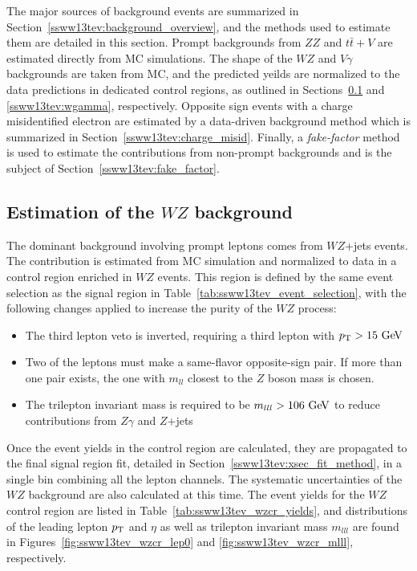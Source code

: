 The major sources of background events are summarized in Section~\ref{ssww13tev:background_overview}, and the methods used to estimate them are detailed in this section.  
Prompt backgrounds from $ZZ$ and $t\bar{t}+V$ are estimated directly from MC simulations.
The shape of the $WZ$ and $V\gamma$ backgrounds are taken from MC, and the predicted yeilds are normalized to the data predictions in dedicated control regions, as outlined in Sections~\ref{ssww13tev:wz} and \ref{ssww13tev:wgamma}, respectively.
Opposite sign events with a charge misidentified electron are estimated by a data-driven background method which is summarized in Section~\ref{ssww13tev:charge_misid}.
Finally, a \emph{fake-factor} method is used to estimate the contributions from non-prompt backgrounds and is the subject of Section~\ref{ssww13tev:fake_factor}.

\subsection{Estimation of the $WZ$ background}\label{ssww13tev:wz}
The dominant background involving prompt leptons comes from $WZ$+jets events.
The contribution is estimated from MC simulation and normalized to data in a control region enriched in $WZ$ events.
This region is defined by the same event selection as the signal region in Table~\ref{tab:ssww13tev_event_selection}, with the following changes applied to increase the purity of the $WZ$ process:
\begin{itemize}
\item The third lepton veto is inverted, requiring a third lepton with $\pt > 15\gev$
\item Two of the leptons must make a same-flavor opposite-sign pair. If more than one pair exists, the one with $m_{ll}$ closest to the $Z$ boson mass is chosen.
\item The trilepton invariant mass is required to be $m_{lll} > 106\gev$ to reduce contributions from $Z\gamma$ and $Z$+jets
\end{itemize}

Once the event yields in the control region are calculated, they are propagated to the final signal region fit, detailed in Section~\ref{ssww13tev:xsec_fit_method}, in a single bin combining all the lepton channels.
The systematic uncertainties of the $WZ$ background are also calculated at this time.
The event yields for the $WZ$ control region are listed in Table~\ref{tab:ssww13tev_wzcr_yields}, and distributions of the leading lepton $p_{\mathrm{T}}$ and $\eta$ as well as trilepton invariant mass $m_{lll}$ are found in Figures~\ref{fig:ssww13tev_wzcr_lep0} and \ref{fig:ssww13tev_wzcr_mlll}, respectively.

